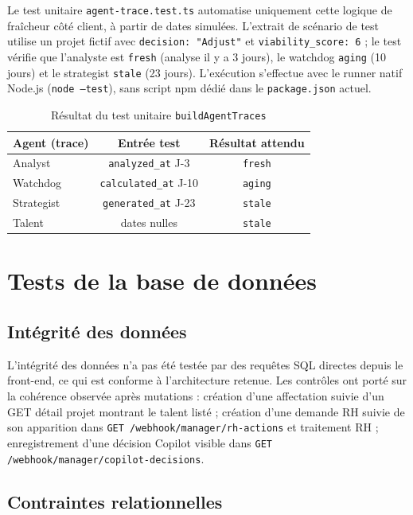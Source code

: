 Le test unitaire \texttt{agent-trace.test.ts} automatise uniquement cette logique de fraîcheur côté client, à partir de dates simulées. L'extrait de scénario de test utilise un projet fictif avec \texttt{decision: "Adjust"} et \texttt{viability\_score: 6} ; le test vérifie que l'analyste est \texttt{fresh} (analyse il y a 3 jours), le watchdog \texttt{aging} (10 jours) et le strategist \texttt{stale} (23 jours). L'exécution s'effectue avec le runner natif Node.js (\texttt{node --test}), sans script npm dédié dans le \texttt{package.json} actuel.

\begin{table}[htbp]
\centering
\caption{Résultat du test unitaire \texttt{buildAgentTraces}}
\label{tab:unit-agent-trace}
\begin{tabular}{@{}lcc@{}}
\toprule
\textbf{Agent (trace)} & \textbf{Entrée test} & \textbf{Résultat attendu} \\
\midrule
Analyst & \texttt{analyzed\_at} J-3 & \texttt{fresh} \\
Watchdog & \texttt{calculated\_at} J-10 & \texttt{aging} \\
Strategist & \texttt{generated\_at} J-23 & \texttt{stale} \\
Talent & dates nulles & \texttt{stale} \\
\bottomrule
\end{tabular}
\end{table}

\section{Tests de la base de données}

\subsection{Intégrité des données}

L'intégrité des données n'a pas été testée par des requêtes SQL directes depuis le front-end, ce qui est conforme à l'architecture retenue. Les contrôles ont porté sur la cohérence observée après mutations : création d'une affectation suivie d'un GET détail projet montrant le talent listé ; création d'une demande RH suivie de son apparition dans \texttt{GET /webhook/manager/rh-actions} et traitement RH ; enregistrement d'une décision Copilot visible dans \texttt{GET /webhook/manager/copilot-decisions}.

\subsection{Contraintes relationnelles}

